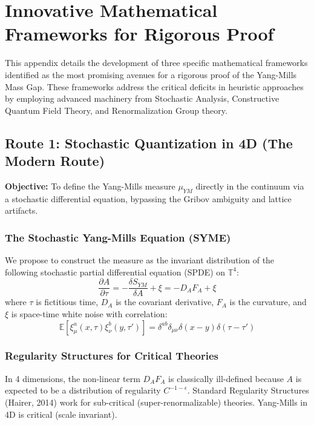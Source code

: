 \chapter{Innovative Mathematical Frameworks for Rigorous Proof}
\label{ch:innovative_frameworks}

This appendix details the development of three specific mathematical frameworks identified as the most promising avenues for a rigorous proof of the Yang-Mills Mass Gap. These frameworks address the critical deficits in heuristic approaches by employing advanced machinery from Stochastic Analysis, Constructive Quantum Field Theory, and Renormalization Group theory.

\section{Route 1: Stochastic Quantization in 4D (The Modern Route)}
\label{sec:stochastic_quantization}

\textbf{Objective:} To define the Yang-Mills measure $\mu_{YM}$ directly in the continuum via a stochastic differential equation, bypassing the Gribov ambiguity and lattice artifacts.

\subsection{The Stochastic Yang-Mills Equation (SYME)}
We propose to construct the measure as the invariant distribution of the following stochastic partial differential equation (SPDE) on $\mathbb{T}^4$:
\begin{equation}
\label{eq:SYME}
\frac{\partial A}{\partial \tau} = - \frac{\delta S_{YM}}{\delta A} + \xi = - D_A F_A + \xi
\end{equation}
where $\tau$ is fictitious time, $D_A$ is the covariant derivative, $F_A$ is the curvature, and $\xi$ is space-time white noise with correlation:
\begin{equation}
\mathbb{E}[\xi_\mu^a(x,\tau) \xi_\nu^b(y,\tau')] = \delta^{ab} \delta_{\mu\nu} \delta(x-y) \delta(\tau-\tau')
\end{equation}

\subsection{Regularity Structures for Critical Theories}
In 4 dimensions, the non-linear term $D_A F_A$ is classically ill-defined because $A$ is expected to be a distribution of regularity $C^{-1-\epsilon}$. Standard Regularity Structures (Hairer, 2014) work for sub-critical (super-renormalizable) theories. Yang-Mills in 4D is critical (scale invariant).

